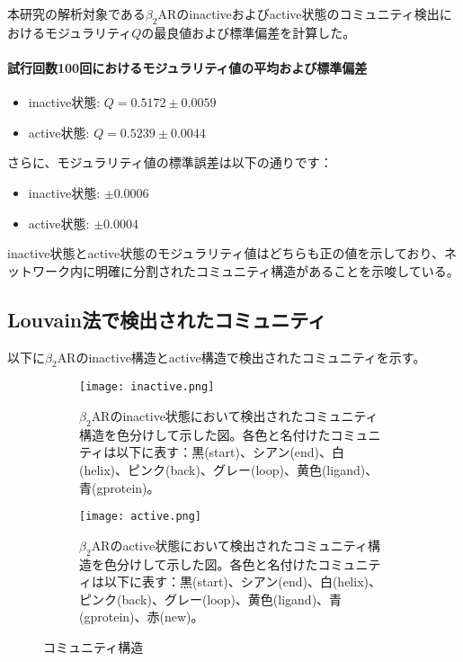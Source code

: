 本研究の解析対象である$\beta_2$ARのinactiveおよびactive状態のコミュニティ検出におけるモジュラリティ$Q$の最良値および標準偏差を計算した。

\paragraph{試行回数100回におけるモジュラリティ値の平均および標準偏差}
\begin{itemize}
    \item inactive状態: \( Q = 0.5172 \pm 0.0059 \)
    \item active状態: \( Q = 0.5239 \pm 0.0044 \)
\end{itemize}
さらに、モジュラリティ値の標準誤差は以下の通りです：
\begin{itemize}
    \item inactive状態: \( \pm 0.0006 \)
    \item active状態: \( \pm 0.0004 \)
\end{itemize}

inactive状態とactive状態のモジュラリティ値はどちらも正の値を示しており、ネットワーク内に明確に分割されたコミュニティ構造があることを示唆している。

\subsection{Louvain法で検出されたコミュニティ}

以下に$\beta_2$ARのinactive構造とactive構造で検出されたコミュニティを示す。

\begin{figure}[htbp]
    \centering
    \begin{subfigure}{0.45\textwidth} %
      \centering
      \texttt{[image: inactive.png]}
      \caption{$\beta_2$ARのinactive状態において検出されたコミュニティ構造を色分けして示した図。各色と名付けたコミュニティは以下に表す：黒(start)、シアン(end)、白(helix)、ピンク(back)、グレー(loop)、黄色(ligand)、青(gprotein)。}
      \label{fig:inactive_community}
    \end{subfigure}
    \hspace{0.05\textwidth} %
    \begin{subfigure}{0.45\textwidth}
      \centering
      \texttt{[image: active.png]}
      \caption{$\beta_2$ARのactive状態において検出されたコミュニティ構造を色分けして示した図。各色と名付けたコミュニティは以下に表す：黒(start)、シアン(end)、白(helix)、ピンク(back)、グレー(loop)、黄色(ligand)、青(gprotein)、赤(new)。}
      \label{fig:active_community}
    \end{subfigure}
    \caption{コミュニティ構造}
    \label{fig:community-all}
  \end{figure}

